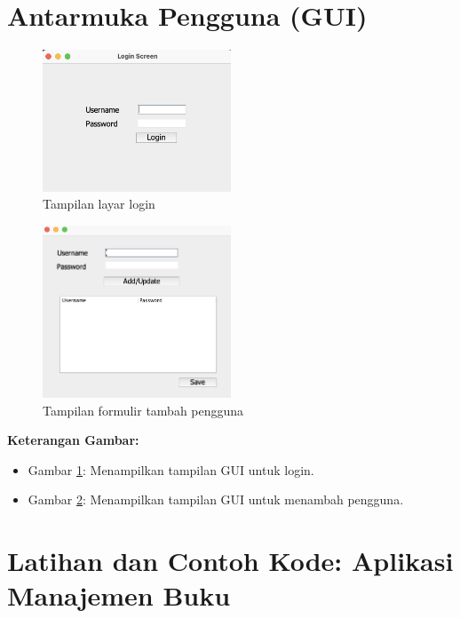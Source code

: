 \section{Antarmuka Pengguna (GUI)}

\begin{figure}[h!]
	\centering
	\includegraphics[width=0.5\textwidth]{assets/login-screen.png}
	\caption{Tampilan layar login}
	\label{fig:login-screen}
\end{figure}

\begin{figure}[h!]
	\centering
	\includegraphics[width=0.5\textwidth]{assets/add-user-form.png}
	\caption{Tampilan formulir tambah pengguna}
	\label{fig:add-user-form}
\end{figure}

\textbf{Keterangan Gambar:} 
\begin{itemize}
	\item Gambar \ref{fig:login-screen}: Menampilkan tampilan GUI untuk login.
	\item Gambar \ref{fig:add-user-form}: Menampilkan tampilan GUI untuk menambah pengguna.
\end{itemize}



\section{Latihan dan Contoh Kode: Aplikasi Manajemen Buku}

